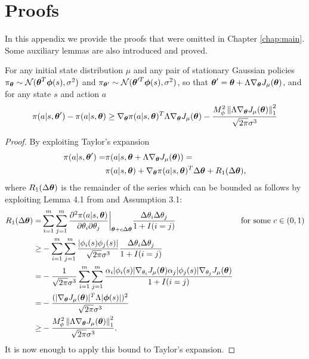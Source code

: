 \chapter{Proofs}\label{app:proofs}
In this appendix we provide the proofs that were omitted in Chapter \ref{chap:main}. Some auxiliary lemmas are also introduced and proved.

\begin{lemma}\label{aux:1}
For any initial state distribution $\mu$ and any pair of stationary Gaussian policies $\pi_{\vtheta} \sim \mathcal{N}(\vtheta^T\boldsymbol{\phi}(s),\sigma^2)$ and $\pi_{\vtheta'} \sim \mathcal{N}(\vtheta'^T\boldsymbol{\phi}(s),\sigma^2)$, so that $\vtheta'=\vtheta+\Lambda\gradJ{\vtheta}$, and for any state $s$ and action $a$
\[
\pi(a|s,\vtheta') - \pi(a|s,\vtheta) \geq \nabla_{\vtheta}\pi(a|s,\vtheta)^T\Lambda\gradJ{\vtheta} 
	- \frac{M_{\phi}^2\norm[1]{\Lambda\gradJ{\vtheta}}^2}{\sqrt{2\pi}\sigma^3}
\]
\end{lemma}

\begin{proof}
By exploiting Taylor's expansion
\begin{align*}
\pi(a|s,\vtheta') = & \pi(a|s,\vtheta + \Lambda\gradJ{\vtheta}) = \\
	& \pi(a|s,\vtheta) + \nabla_{\vtheta}\pi(a|s,\vtheta)^T\Delta\vtheta+R_1(\Delta\vtheta),
\end{align*}
where $R_1(\Delta\vtheta)$ is the remainder of the series which can be bounded as follows by exploiting Lemma 4.1 from \cite{NIPS2013_5186} and Assumption 3.1:
\begin{align*}
R_1(\Delta\vtheta) = & \sum\limits_{i=1}^m\sum\limits_{j=1}^m
\frac{\partial^2\pi(a|s,\vtheta)}{\partial\theta_i\partial\theta_j} \bigg|_{\vtheta+c\Delta\vtheta} \frac{\Delta\theta_i\Delta\theta_j}{1+I(i=j)} && \text{for some $c \in (0,1)$} \\
	\geq & - \sum\limits_{i=1}^m\sum\limits_{j=1}^m \frac{|\phi_i(s)\phi_j(s)|}{\sqrt{2\pi}\sigma^3}
	\frac{\Delta\theta_i\Delta\theta_j}{1+I(i=j)} \\
	= & -\frac{1}{\sqrt{2\pi}\sigma^3}\sum\limits_{i=1}^m\sum\limits_{j=1}^m
	\frac{\alpha_i|\phi_i(s)|\gradJ{\theta_i}\alpha_j|\phi_j(s)|\gradJ{\theta_j}}{1+I(i=j)} \\
	= & - \frac{(|\gradJ{\vtheta}|^T\Lambda|\vphi(s)|)^2}{\sqrt{2\pi}\sigma^3} \\
	\geq & - \frac{M_{\phi}^2\norm[1]{\Lambda\gradJ{\vtheta}}^2}{\sqrt{2\pi}\sigma^3}.
\end{align*}
It is now enough to apply this bound to Taylor's expansion.
\end{proof}

